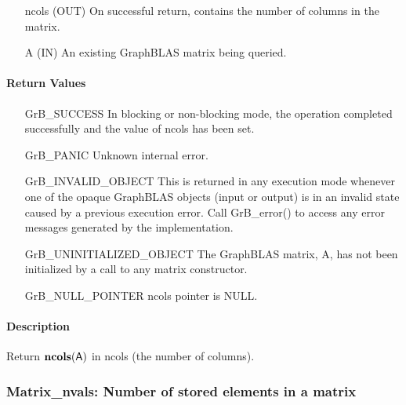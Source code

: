 \begin{itemize}[leftmargin=1.1in]
    \item[{\sf ncols}] ({\sf OUT}) On successful return, contains the number of columns in the matrix.
    \item[{\sf A}] ({\sf IN}) An existing GraphBLAS matrix being queried.
\end{itemize}

\paragraph{Return Values}

\begin{itemize}[leftmargin=2.1in]
    \item[{\sf GrB\_SUCCESS}]   In blocking or non-blocking mode, the operation 
    completed successfully and the value of {\sf ncols} has been set.

    \item[{\sf GrB\_PANIC}]     Unknown internal error.
    
    \item[{\sf GrB\_INVALID\_OBJECT}] This is returned in any execution mode 
    whenever one of the opaque GraphBLAS objects (input or output) is in an invalid 
    state caused by a previous execution error.  Call {\sf GrB\_error()} to access 
    any error messages generated by the implementation.

    \item[{\sf GrB\_UNINITIALIZED\_OBJECT}]  The GraphBLAS matrix, {\sf A}, has 
    not been initialized by a call to any matrix constructor.
    
    \item[{\sf GrB\_NULL\_POINTER}]  {\sf ncols} pointer is {\sf NULL}.
\end{itemize}

\paragraph{Description}

Return $\mathbf{ncols}({\sf A})$ in {\sf ncols} (the number of columns).

\subsubsection{{\sf Matrix\_nvals}: Number of stored elements in a matrix}
\label{Sec:Matrix_nvals}

